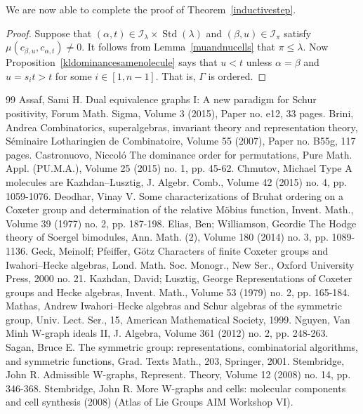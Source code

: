 \documentclass[10pt]{amsart}
\theoremstyle{definition}
\DeclareMathOperator{\STD}{Std}
\begin{document}
We are now able to complete the proof of Theorem~\ref{inductivestep}.

\begin{proof}
Suppose that $(\alpha,t)\in\mathcal{I}_{\lambda}\times\STD(\lambda)$ and
$(\beta,u)\in\mathcal{I}_{\pi}$ satisfy
$\mu(c_{\beta,u},c_{\alpha,t}) \neq 0$. It follows from
Lemma~\ref{muandnucells} that $\pi\leqslant\lambda$. Now
Proposition~\ref{kldominancesamenolecule} says that
$u < t$ unless $\alpha=\beta$ and $u=s_i t>t$ for
some $i\in[1,n-1]$. That is, $\Gamma$ is ordered.
\end{proof}
\begin{thebibliography}{99}
 Assaf, Sami H. Dual equivalence graphs I: A new paradigm for Schur positivity, Forum Math. Sigma, Volume 3 (2015), Paper no. e12, 33 pages.
 Brini, Andrea Combinatorics, superalgebras, invariant theory and representation theory, Séminaire Lotharingien de Combinatoire, Volume 55 (2007), Paper no. B55g, 117 pages.
 Castronuovo, Niccoló The dominance order for permutations, Pure Math. Appl. (PU.M.A.), Volume 25 (2015) no. 1, pp. 45-62.
 Chmutov, Michael Type A molecules are Kazhdan–Lusztig, J. Algebr. Comb., Volume 42 (2015) no. 4, pp. 1059-1076.
 Deodhar, Vinay V. Some characterizations of Bruhat ordering on a Coxeter group and determination of the relative Möbius function, Invent. Math., Volume 39 (1977) no. 2, pp. 187-198.
 Elias, Ben; Williamson, Geordie The Hodge theory of Soergel bimodules, Ann. Math. (2), Volume 180 (2014) no. 3, pp. 1089-1136.
 Geck, Meinolf; Pfeiffer, Götz Characters of finite Coxeter groups and Iwahori–Hecke algebras, Lond. Math. Soc. Monogr., New Ser., Oxford University Press, 2000 no. 21.
 Kazhdan, David; Lusztig, George Representations of Coxeter groups and Hecke algebras, Invent. Math., Volume 53 (1979) no. 2, pp. 165-184.
 Mathas, Andrew Iwahori–Hecke algebras and Schur algebras of the symmetric group, Univ. Lect. Ser., 15, American Mathematical Society, 1999.
 Nguyen, Van Minh W-graph ideals II, J. Algebra, Volume 361 (2012) no. 2, pp. 248-263.
 Sagan, Bruce E. The symmetric group: representations, combinatorial algorithms, and symmetric functions, Grad. Texts Math., 203, Springer, 2001.
 Stembridge, John R. Admissible W-graphs, Represent. Theory, Volume 12 (2008) no. 14, pp. 346-368.
 Stembridge, John R. More W-graphs and cells: molecular components and cell synthesis (2008) (Atlas of Lie Groups AIM Workshop VI).
\end{thebibliography}
\end{document}
